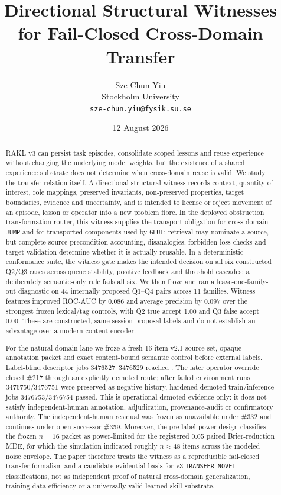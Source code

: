 \documentclass[11pt]{article}
\title{Directional Structural Witnesses for Fail-Closed Cross-Domain Transfer}
\author{Sze Chun Yiu\\Stockholm University\\\texttt{sze-chun.yiu@fysik.su.se}}
\date{12 August 2026}
\begin{document}
\maketitle
\begin{abstract}
RAKL v3 can persist task episodes, consolidate scoped lessons and reuse experience without changing the underlying model weights, but the existence of a shared experience substrate does not determine when cross-domain reuse is valid. We study the transfer relation itself. A directional structural witness records context, quantity of interest, role mappings, preserved invariants, non-preserved properties, target boundaries, evidence and uncertainty, and is intended to license or reject movement of an episode, lesson or operator into a new problem fibre. In the deployed obstruction--transformation router, this witness supplies the transport obligation for cross-domain \texttt{JUMP} and for transported components used by \texttt{GLUE}: retrieval may nominate a source, but complete source-precondition accounting, disanalogies, forbidden-loss checks and target validation determine whether it is actually reusable. In a deterministic conformance suite, the witness gate makes the intended decision on all six constructed Q2/Q3 cases across queue stability, positive feedback and threshold cascades; a deliberately semantic-only rule fails all six. We then froze and ran a leave-one-family-out diagnostic on 44 internally proposed Q1--Q4 pairs across 11 families. Witness features improved ROC-AUC by 0.086 and average precision by 0.097 over the strongest frozen lexical/tag controls, with Q2 true accept 1.00 and Q3 false accept 0.00. These are constructed, same-session proposal labels and do not establish an advantage over a modern content encoder.

For the natural-domain lane we froze a fresh 16-item v2.1 source set, opaque annotation packet and exact content-bound  semantic control before external labels. Label-blind descriptor jobs 3476527--3476529 reached . The later operator override closed \#217 through an explicitly demoted  route; after failed environment runs 3476750/3476751 were preserved as negative history, hardened demoted train/inference jobs 3476753/3476754 passed. This is operational demoted evidence only: it does not satisfy independent-human annotation, adjudication, provenance-audit or confirmatory authority. The independent-human residual was frozen as unavailable under \#332 and continues under open successor \#359. Moreover, the pre-label power design classifies the frozen $n=16$ packet as power-limited for the registered 0.05 paired Brier-reduction MDE, for which the simulation indicated roughly $n\approx48$ items across the modeled noise envelope. The paper therefore treats the witness as a reproducible fail-closed transfer formalism and a candidate evidential basis for v3 \texttt{TRANSFER\_NOVEL} classifications, not as independent proof of natural cross-domain generalization, training-data efficiency or a universally valid learned skill substrate.
\end{abstract}
\end{document}
